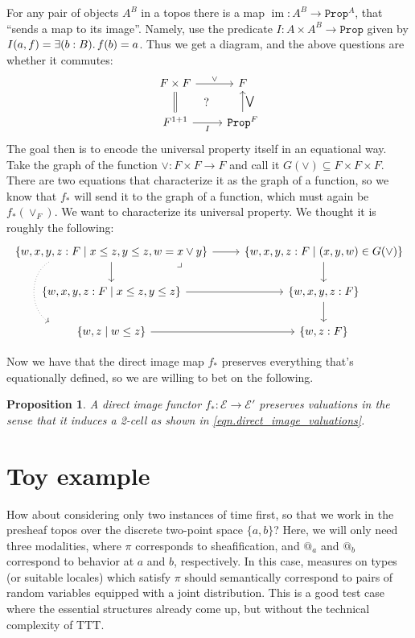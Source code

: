 \documentclass[11pt, oneside, article]{memoir}
\makeatletter
\theoremstyle{plain}
\newtheorem{proposition}[theorem]{Proposition}
\theoremstyle{definition}
\theoremstyle{remark}
\renewcommand{\ss}{\subseteq}
\DeclareMathOperator{\im}{im}
\newcommand{\const}[1]{\mathtt{#1}}
\newcommand{\cat}[1]{\mathcal{#1}}
\newcommand{\Prop}{\const{Prop}}
\newcommand{\AtSymbol}{{@}}
\newcommand{\At}[2][]{\AtSymbol^{#1}_{#2}}
\makeatother
\begin{document}
For any pair of objects $A^B$ in a topos there is a map $\im\colon A^B\to\Prop^A$, that ``sends a map to its image''. Namely, use the predicate $I\colon A\times A^B\to\Prop$ given by $I(a,f)=\exists(b:B)\ldotp f(b)=a$. Thus we get a diagram, and the above questions are whether it commutes:
\[
\begin{tikzcd}
	F\times F\ar[d, equal]\ar[r, "\vee"]&F\\
	F^{1+1}\ar[r, "I"']&\Prop^F\ar[u, "\bigvee"']\ar[ul, phantom, "?"]
\end{tikzcd}
\]
The goal then is to encode the universal property itself in an equational way. Take the graph of the function $\vee\colon F\times F\to F$ and call it $G(\vee)\ss F\times F\times F$. There are two equations that characterize it as the graph of a function, so we know that $f_*$ will send it to the graph of a function, which must again be $f_*(\vee_F)$. We want to characterize its universal property. We thought it is roughly the following:
\[
\begin{tikzcd}
	\{w,x,y,z:F\mid x\leq z, y\leq z, w=x\vee y\}\ar[r]\ar[d]\ar[dd, shift right=40pt, bend right=60pt, dotted]
	&\{w,x,y,z:F\mid (x,y,w)\in G(\vee)\}\ar[d]\\
	\{w,x,y,z:F\mid x\leq z, y\leq z\}\ar[r]&\{w,x,y,z:F\}\ar[ul, phantom, very near end, "\lrcorner"]\ar[d]\\
	\{w,z\mid w\leq z\}\ar[r]&\{w,z:F\}
\end{tikzcd}
\]

Now we have that the direct image map $f_*$ preserves everything that's equationally defined, so we are willing to bet on the following.
\begin{proposition}
A direct image functor $f_*\colon\cat{E}\to\cat{E'}$ preserves valuations in the sense that it induces a 2-cell as shown in \cref{eqn.direct_image_valuations}.
\end{proposition}
\chapter{Toy example}


How about considering only two instances of time first, so that we work in the presheaf topos over the discrete two-point space $\{a,b\}$? Here, we will only need three modalities, where $\pi$ corresponds to sheafification, and $\At{a}{}$ and $\At{b}{}$ correspond to behavior at $a$ and $b$, respectively. In this case, measures on types (or suitable locales) which satisfy $\pi$ should semantically correspond to pairs of random variables equipped with a joint distribution. This is a good test case where the essential structures already come up, but without the technical complexity of TTT.
\end{document}
